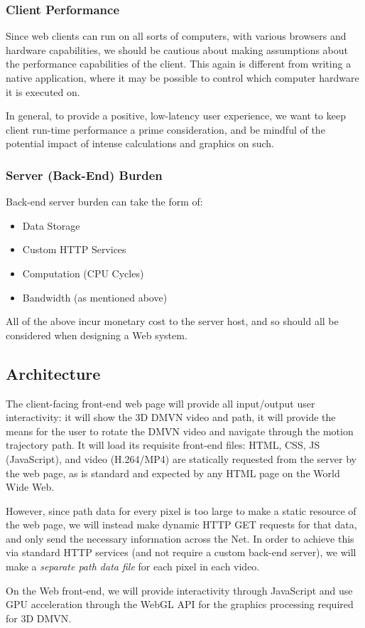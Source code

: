 \subsubsection{Client Performance}
Since web clients can run on all sorts of computers, with various browsers and hardware capabilities, we should be cautious about making assumptions about the performance capabilities of the client. This again is different from writing a native application, where it may be possible to control which computer hardware it is executed on.
\par In general, to provide a positive, low-latency user experience, we want to keep client run-time performance a prime consideration, and be mindful of the potential impact of intense calculations and graphics on such.

\subsubsection{Server (Back-End) Burden}
Back-end server burden can take the form of:
\begin{itemize}
    \item Data Storage
    \item Custom HTTP Services
    \item Computation (CPU Cycles)
    \item Bandwidth (as mentioned above)
\end{itemize}
All of the above incur monetary cost to the server host, and so should all be considered when designing a Web system.


\subsection {Architecture}
The client-facing front-end web page will provide all input/output user interactivity: it will show the 3D DMVN video and path, it will provide the means for the user to rotate the DMVN video and navigate through the motion trajectory path. It will load its requisite front-end files: HTML, CSS, JS (JavaScript), and video (H.264/MP4) are statically requested from the server by the web page, as is standard and expected by any HTML page on the World Wide Web.
\par However, since path data for every pixel is too large to make a static resource of the web page, we will instead make dynamic HTTP GET requests for that data, and only send the necessary information across the Net. In order to achieve this via standard HTTP services (and not require a custom back-end server), we will make a \emph{separate path data file} for each pixel in each video.
\par On the Web front-end, we will provide interactivity through JavaScript and use GPU acceleration through the WebGL API for the graphics processing required for 3D DMVN.

